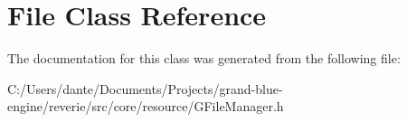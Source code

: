 \hypertarget{class_file}{}\section{File Class Reference}
\label{class_file}


The documentation for this class was generated from the following file\+:\begin{DoxyCompactItemize}
\item 
C\+:/\+Users/dante/\+Documents/\+Projects/grand-\/blue-\/engine/reverie/src/core/resource/G\+File\+Manager.\+h\end{DoxyCompactItemize}
